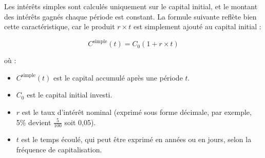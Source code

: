 \documentclass{article}
\begin{document}
\begin{tcolorbox}[
    colback=lightgreen, 
    colframe=lightgreen, 
    boxrule=0.5pt, 
    arc=0pt, 
    left=10pt, 
    right=10pt, 
    top=6pt, 
    bottom=6pt, 
    boxsep=2pt, 
    before upper={\faLightbulb\hspace{10pt}}
]
    Les intérêts simples sont calculés uniquement sur le capital initial, et le montant des intérêts gagnés chaque période est constant. La formule suivante reflète bien cette caractéristique, car le produit \( r \times t \) est simplement ajouté au capital initial :

    \[
    C^{\text{simple}}(t) = C_0 \left(1 + r \times t\right)
    \]
    
    où :
    \begin{itemize}
        \item \( C^{\text{simple}}(t) \) est le capital accumulé après une période \( t \).
        \item \( C_0 \) est le capital initial investi.
        \item \( r \) est le taux d'intérêt nominal (exprimé sous forme décimale, par exemple, 5\% devient $\frac{5}{100}$ soit 0,05).
        \item \( t \) est le temps écoulé, qui peut être exprimé en années ou en jours, selon la fréquence de capitalisation.
    \end{itemize}
\end{tcolorbox}
\end{document}
